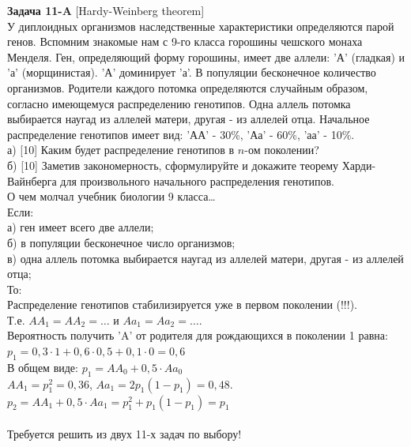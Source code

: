 \documentclass[12pt, a4paper]{article}\usepackage[]{graphicx}\usepackage[]{color}
\begin{document}
{\bf Задача 11-A} [Hardy-Weinberg theorem]\\
У диплоидных организмов наследственные характеристики определяются
парой генов. Вспомним знакомые нам с 9-го класса горошины чешского
монаха Менделя. Ген, определяющий форму горошины, имеет две
аллели:  'А' (гладкая) и 'а' (морщинистая). 'А' доминирует 'а'. В
популяции бесконечное количество организмов. Родители каждого
потомка определяются случайным образом, согласно имеющемуся
распределению генотипов. Одна аллель потомка выбирается наугад из
аллелей матери, другая - из аллелей отца. Начальное распределение
генотипов имеет вид: 'АА' - 30\%, 'Аа' - 60\%, 'аа' - 10\%. \\
а) [10] Каким будет распределение генотипов в $n$-ом поколении? \\
б) [10] Заметив закономерность, сформулируйте и докажите теорему
Харди-Вайнберга для произвольного начального распределения
генотипов. \\
О чем молчал учебник биологии 9 класса\ldots \\
Если: \\
а) ген имеет всего две аллели; \\
б) в популяции бесконечное число организмов; \\
в) одна аллель потомка выбирается наугад из аллелей матери, другая
- из аллелей отца; \\
То: \\
Распределение генотипов стабилизируется уже в первом поколении
(!!!). \\
Т.е.
$AA_{1}=AA_{2}=\ldots$ и $Aa_{1}=Aa_{2}=\ldots$. \\
Вероятность получить 'A' от родителя для рождающихся в поколении 1
равна: $p_{1}=0,3\cdot 1+0,6\cdot 0,5 + 0,1\cdot 0=0,6$ \\
В общем виде: $p_{1}=AA_{0}+0,5\cdot Aa_{0}$ \\
$AA_{1}=p_{1}^{2}=0,36$, $Aa_{1}=2p_{1}(1-p_{1})=0,48$. \\
$p_{2}=AA_{1}+0,5\cdot Aa_{1}=p_{1}^{2}+p_{1}(1-p_{1})=p_{1}$ \\
\\


Требуется решить {\bf {}} из двух 11-х задач по
выбору! \\
\end{document}
